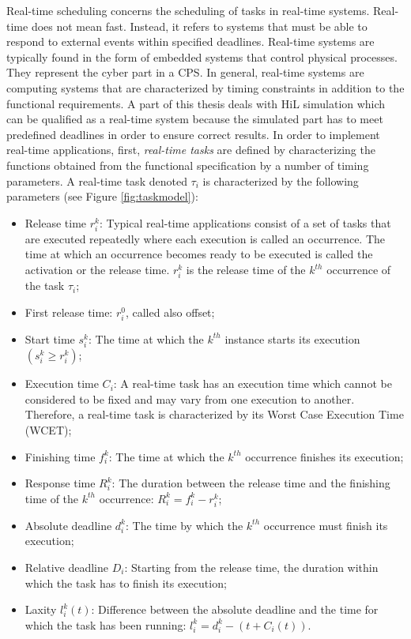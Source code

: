 Real-time scheduling concerns the scheduling of tasks in real-time systems. Real-time does not mean fast. Instead, it refers to systems that must be able to respond to external events within specified deadlines. Real-time systems are typically found in the form of embedded systems that control physical processes. They represent the cyber part in a CPS. In general, real-time systems are computing systems that are characterized by timing constraints in addition to the functional requirements. A part of this thesis deals with HiL simulation which can be qualified as a real-time system because the simulated part has to meet predefined deadlines in order to ensure correct results.
In order to implement real-time applications, first, \textit{real-time tasks} are defined by characterizing the functions obtained from the functional specification by a number of timing parameters. A real-time task denoted $\tau_i$ is characterized by the following parameters (see Figure \ref{fig:taskmodel}):
\begin{itemize}
\item Release time $r^k_i$: Typical real-time applications consist of a set of tasks that are executed repeatedly where each execution is called an occurrence. The time at which an occurrence becomes ready to be executed is called the activation or the release time. $r^k_i$ is the release time of the $k^{th}$ occurrence of the task $\tau_i$;
\item First release time: $r^0_i$, called also offset;
\item Start time $s^k_i$: The time at which the $k^{th}$ instance starts its execution $(s^k_i \geq r^k_i)$;
\item Execution time $C_i$: A real-time task has an execution time which cannot be considered to be fixed and may vary from one execution to another. Therefore, a real-time task is characterized by its Worst Case Execution Time (WCET);
\item Finishing time $f^k_i$: The time at which the $k^{th}$ occurrence finishes its execution;
\item Response time $R^k_i$: The duration between the release time and the finishing time of the $k^{th}$ occurrence: $R^k_i = f^k_i - r^k_i$;
\item Absolute deadline $d^k_i$: The time by which the $k^{th}$ occurrence must finish its execution;
\item Relative deadline $D_i$: Starting from the release time, the duration within which the task has to finish its execution;
\item Laxity $l^k_i(t)$: Difference between the absolute deadline and the time for which the task has been running: $l^k_i=d^k_i-(t+C_i(t))$.
\end{itemize}

